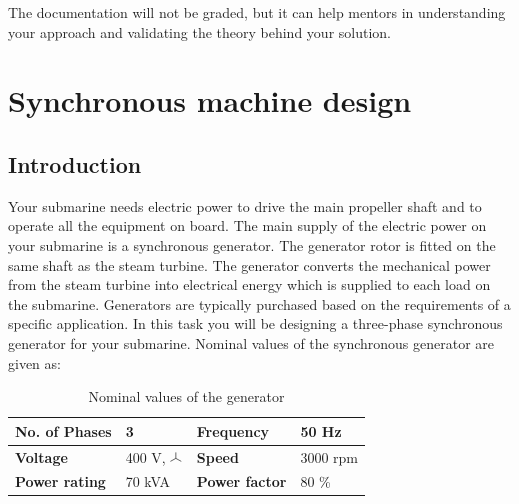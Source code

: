 \documentclass{article}
\newcommand{\wye}{\mathbin{\tikz[x=1ex,y=1ex]{\draw[line width=.1ex] (0,0)--(30:1)--++(-30:1) (30:1)--++(0,1);}}}
\begin{document}
The documentation will not be graded, but it can help mentors in understanding your approach and validating the theory behind your solution.
	
\newpage
\section{Synchronous machine design}

\subsection{Introduction}

Your submarine needs electric power to drive the main propeller shaft and to operate all the equipment on board. The main supply of the electric power on your submarine is a synchronous generator. The generator rotor is fitted on the same shaft as the steam turbine. The generator converts the mechanical power from the steam turbine into electrical energy which is supplied to each load on the submarine. Generators are typically purchased based on the requirements of a specific application. In this task you will be designing a three-phase synchronous generator for your submarine. Nominal values of the synchronous generator are given as: 
\begin{table}[h!]
    \caption{Nominal values of the generator}
    \label{tab:nominalValues}
    \begin{tabularx}{\textwidth}{|Y|Y|Y|Y|} \hline
    \textbf{No. of Phases} & 3 & \textbf{Frequency} & 50 Hz \\ \hline \textbf{Voltage} & 400 V, {\Large $\wye$} & \textbf{Speed} & 3000 rpm \\ \hline
    \textbf{Power rating} & 70 kVA & \textbf{Power factor} & 80 \% \\ \hline
    \end{tabularx}
\end{table}
\end{document}
